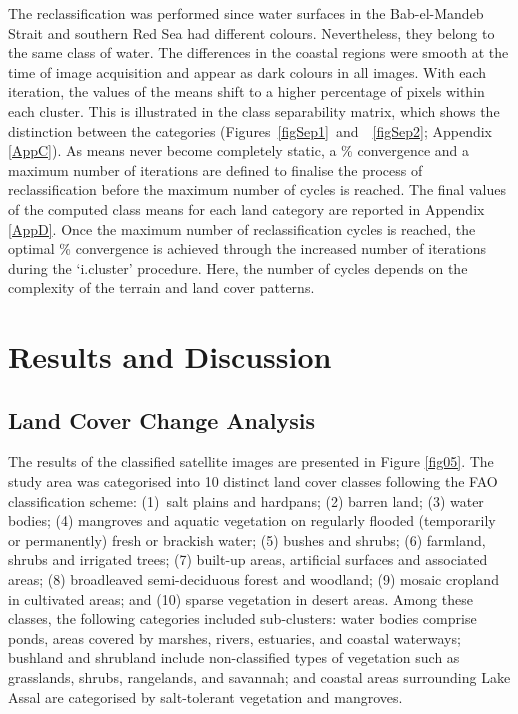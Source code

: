 \documentclass[jimaging,article,accept,pdftex,moreauthors]{Definitions/mdpi}
\begin{document}
{The reclassification was performed since water surfaces in the Bab-el-Mandeb Strait and southern Red Sea had different colours. Nevertheless, they belong to the same class of water. The differences in the coastal regions were smooth at the time of image acquisition and appear as dark colours in all images. {With each iteration, the values of the {means shift to a higher} %
percentage of pixels within each cluster. This is illustrated in the class separability matrix, which shows the distinction between the categories} (\mbox{Figures \ref{figSep1} {and } \ref{figSep2}}; Appendix \ref{AppC}). {As means never become completely static, a \% convergence and a maximum number of iterations are defined to finalise the process of reclassification before the maximum number of cycles {is reached}. %
The final values of the computed class means for each land category are reported in Appendix} \ref{AppD}. {Once the maximum number of reclassification cycles is reached, the optimal \% convergence is achieved through the increased number of iterations during the ‘i.cluster' procedure. Here, the number of cycles depends on the complexity of the terrain and land cover patterns.} 

\section{Results and Discussion}\label{sec4}

\subsection{Land Cover Change Analysis}
{The results of the classified }satellite images are {presented in Figure} \ref{fig05}. The{ }study {area} was categorised into 10 distinct land cover classes following the FAO classification scheme: \mbox{(1) salt} plains and hardpans; (2) barren land; (3) water bodies; (4) mangroves and aquatic vegetation on regularly flooded (temporarily or permanently) fresh or brackish water; (5) bushes and shrubs; (6) farmland, {shrubs} %
and irrigated trees; (7) built-up areas, artificial surfaces and associated areas; (8) broadleaved semi-deciduous forest and woodland; (9) mosaic cropland in cultivated areas; and (10) sparse vegetation in desert areas. Among these classes, the following categories included sub-clusters: water bodies comprise ponds, areas covered by marshes, rivers, estuaries, and coastal waterways; bushland and shrubland include non-classified types of vegetation such as grasslands, shrubs, rangelands, and savannah; and coastal areas surrounding Lake Assal are categorised by salt-tolerant vegetation and mangroves.}
\end{document}
